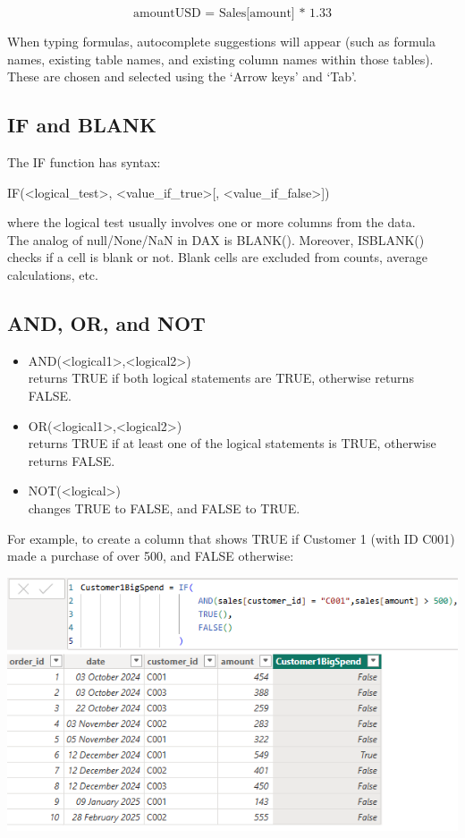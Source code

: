 \documentclass[10pt, openany, twocolumn]{book}
\begin{document}
$$\text{amountUSD = Sales[amount] * 1.33}$$

\begin{tcolorbox}[colback=yellow!2!white, colframe=yellow!60!gray]
When typing formulas, autocomplete suggestions will appear (such as formula names, existing table names, and existing column names within those tables). These are chosen and selected using the `Arrow keys' and `Tab'. 
\end{tcolorbox}

\subsection*{IF and BLANK}

The IF function has syntax:
\begin{center}
IF(<logical\_test>, <value\_if\_true>[, <value\_if\_false>])
\end{center}
where the logical test usually involves one or more columns from the data.\\

The analog of null/None/NaN in DAX is BLANK(). Moreover, ISBLANK() checks if a cell is blank or not. Blank cells are excluded from counts, average calculations, etc.

\subsection*{AND, OR, and NOT}

\begin{itemize}
    \item AND(<logical1>,<logical2>)\\
    returns TRUE if both logical statements are TRUE, otherwise returns FALSE.    
    \item OR(<logical1>,<logical2>)\\
    returns TRUE if at least one of the logical statements is TRUE, otherwise returns  FALSE.
    \item NOT(<logical>)\\
    changes TRUE to FALSE, and FALSE to TRUE.
\end{itemize}

For example, to create a column that shows TRUE if Customer 1 (with ID C001) made a purchase of over 500, and FALSE otherwise:

\begin{center}
    \includegraphics[width = 0.95\columnwidth]{images/DAX_IF_AND.png}
\end{center}
\end{document}
